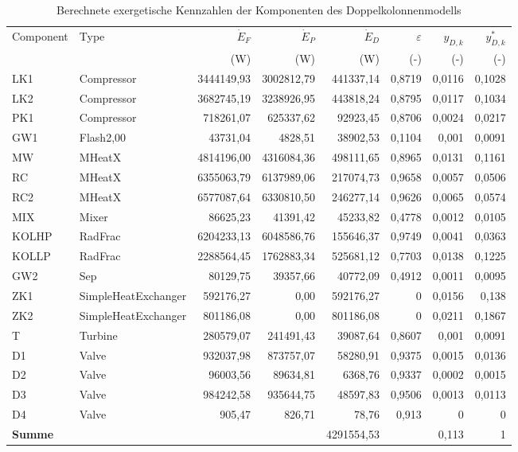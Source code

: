 \begin{longtable}{llrrrrrr}
\caption{Berechnete exergetische Kennzahlen der Komponenten des Doppelkolonnenmodells} \\
\hline
Component & Type & $\dot{E}_F$ & $\dot{E}_P$ & $\dot{E}_D$ & $\varepsilon$ & $y_{D,k}$ & $y^*_{D,k}$  \\
 &  & (W) & (W) & (W) & (-) & (-) & (-)  \\
\hline
LK1 & Compressor & 3444149,93 & 3002812,79 & 441337,14 & 0,8719 & 0,0116 & 0,1028 \\
LK2 & Compressor & 3682745,19 & 3238926,95 & 443818,24 & 0,8795 & 0,0117 & 0,1034 \\
PK1 & Compressor & 718261,07 & 625337,62 & 92923,45 & 0,8706 & 0,0024 & 0,0217 \\
GW1 & Flash2,00 & 43731,04 & 4828,51 & 38902,53 & 0,1104 & 0,001 & 0,0091 \\
MW & MHeatX & 4814196,00 & 4316084,36 & 498111,65 & 0,8965 & 0,0131 & 0,1161 \\
RC & MHeatX & 6355063,79 & 6137989,06 & 217074,73 & 0,9658 & 0,0057 & 0,0506 \\
RC2 & MHeatX & 6577087,64 & 6330810,50 & 246277,14 & 0,9626 & 0,0065 & 0,0574 \\
MIX & Mixer & 86625,23 & 41391,42 & 45233,82 & 0,4778 & 0,0012 & 0,0105 \\
KOLHP & RadFrac & 6204233,13 & 6048586,76 & 155646,37 & 0,9749 & 0,0041 & 0,0363 \\
KOLLP & RadFrac & 2288564,45 & 1762883,34 & 525681,12 & 0,7703 & 0,0138 & 0,1225 \\
GW2 & Sep & 80129,75 & 39357,66 & 40772,09 & 0,4912 & 0,0011 & 0,0095 \\
ZK1 & SimpleHeatExchanger & 592176,27 & 0,00 & 592176,27 & 0 & 0,0156 & 0,138 \\
ZK2 & SimpleHeatExchanger & 801186,08 & 0,00 & 801186,08 & 0 & 0,0211 & 0,1867 \\
T & Turbine & 280579,07 & 241491,43 & 39087,64 & 0,8607 & 0,001 & 0,0091 \\
D1 & Valve & 932037,98 & 873757,07 & 58280,91 & 0,9375 & 0,0015 & 0,0136 \\
D2 & Valve & 96003,56 & 89634,81 & 6368,76 & 0,9337 & 0,0002 & 0,0015 \\
D3 & Valve & 984242,58 & 935644,75 & 48597,83 & 0,9506 & 0,0013 & 0,0113 \\
D4 & Valve & 905,47 & 826,71 & 78,76 & 0,913 & 0 & 0 \\
\hline
\textbf{Summe} & &  &  & 4291554,53 &  & 0,113 & 1 \\
\hline
\end{longtable}
